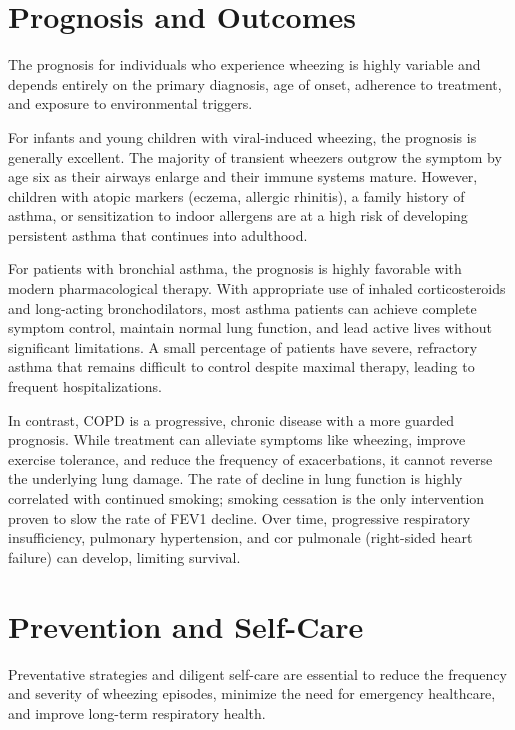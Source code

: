 \section*{Prognosis and Outcomes}
The prognosis for individuals who experience wheezing is highly variable and depends entirely on the primary diagnosis, age of onset, adherence to treatment, and exposure to environmental triggers.

For infants and young children with viral-induced wheezing, the prognosis is generally excellent. The majority of transient wheezers outgrow the symptom by age six as their airways enlarge and their immune systems mature. However, children with atopic markers (eczema, allergic rhinitis), a family history of asthma, or sensitization to indoor allergens are at a high risk of developing persistent asthma that continues into adulthood.

For patients with bronchial asthma, the prognosis is highly favorable with modern pharmacological therapy. With appropriate use of inhaled corticosteroids and long-acting bronchodilators, most asthma patients can achieve complete symptom control, maintain normal lung function, and lead active lives without significant limitations. A small percentage of patients have severe, refractory asthma that remains difficult to control despite maximal therapy, leading to frequent hospitalizations.

In contrast, COPD is a progressive, chronic disease with a more guarded prognosis. While treatment can alleviate symptoms like wheezing, improve exercise tolerance, and reduce the frequency of exacerbations, it cannot reverse the underlying lung damage. The rate of decline in lung function is highly correlated with continued smoking; smoking cessation is the only intervention proven to slow the rate of FEV1 decline. Over time, progressive respiratory insufficiency, pulmonary hypertension, and cor pulmonale (right-sided heart failure) can develop, limiting survival.

\section*{Prevention and Self-Care}
Preventative strategies and diligent self-care are essential to reduce the frequency and severity of wheezing episodes, minimize the need for emergency healthcare, and improve long-term respiratory health.

